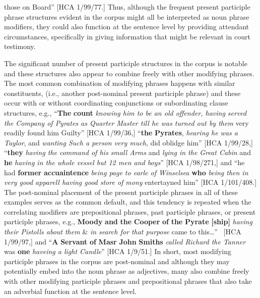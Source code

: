 those on Board” [HCA 1/99/77.] Thus, although the frequent present participle phrase structures evident in the corpus might all be interpreted as noun phrase modifiers, they could also function at the sentence level by providing attendant circumstances, specifically in giving information that might be relevant in court testimony. 

  The significant number of present participle structures in the corpus is notable and these structures also appear to combine freely with other modifying phrases. The most common combination of modifying phrases happens with similar constituents, (i.e., another post-nominal present participle phrase) and these occur with or without coordinating conjunctions or subordinating clause structures, e.g.,  “\textbf{The} \textbf{count} \textit{knowing him to be an old offender, having served the Company of Pyrates as Quarter Master till he was turned out by them} very readily found him Guilty” [HCA 1/99/36,] “\textbf{the} \textbf{Pyrates}, \textit{hearing he was a Taylor}, and \textit{wanting Such a person very much}, did oblidge him” [HCA 1/99/28,] “\textbf{they} \textit{having the command of his small Arms} and \textit{lying in the Great Cabin} and \textbf{he} \textit{having in the whole vessel but 12 men and boys}” [HCA 1/98/271,] and “he had \textbf{former} \textbf{accuaintence} \textit{being page to earle of Winselsea} \textbf{who} \textit{being then in very good apparell having good store of mony} entertayned him” [HCA 1/101/408.] The post-nominal placement of the present participle phrases in all of these examples serves as the common default, and this tendency is repeated when the correlating modifiers are prepositional phrases, past participle phrases, or present participle phrases, e.g., \textbf{Moody} \textbf{and} \textbf{the} \textbf{Cooper} \textbf{of} \textbf{the} \textbf{Pyrate} \textbf{[ship]} \textit{having their Pistolls about them} \& \textit{in search for that purpose} came to this…” ~[HCA 1/99/97,] and “\textbf{A} \textbf{Servant} \textbf{of} \textbf{Masr} \textbf{John} \textbf{Smiths} \textit{called Richard the Tanner} was \textbf{one} \textit{haveing a light Candle}” [HCA 1/9/51.] In short, most modifying participle phrases in the corpus are post-nominal and although they may potentially embed into the noun phrase as adjectives, many also combine freely with other modifying participle phrases and prepositional phrases that also take an adverbial function at the sentence level. 

